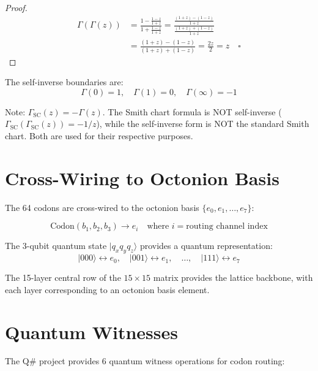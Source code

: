 \documentclass[11pt]{article}
\begin{document}
\begin{proof}
\begin{align*}
\Gamma(\Gamma(z)) &= \frac{1 - \frac{1-z}{1+z}}{1 + \frac{1-z}{1+z}} = \frac{\frac{(1+z) - (1-z)}{1+z}}{\frac{(1+z) + (1-z)}{1+z}} \\
&= \frac{(1+z) - (1-z)}{(1+z) + (1-z)} = \frac{2z}{2} = z \quad \square
\end{align*}
\end{proof}

The self-inverse boundaries are:
\begin{equation}
\Gamma(0) = 1, \quad \Gamma(1) = 0, \quad \Gamma(\infty) = -1
\end{equation}

Note: $\Gamma_{\text{SC}}(z) = -\Gamma(z)$. The Smith chart formula is NOT self-inverse ($\Gamma_{\text{SC}}(\Gamma_{\text{SC}}(z)) = -1/z$), while the self-inverse form is NOT the standard Smith chart. Both are used for their respective purposes.

\section{Cross-Wiring to Octonion Basis}

The 64 codons are cross-wired to the octonion basis $\{e_0, e_1, \ldots, e_7\}$:

\begin{equation}
\text{Codon}(b_1, b_2, b_3) \to e_i \quad \text{where } i = \text{routing channel index}
\end{equation}

The 3-qubit quantum state $|q_x q_y q_z\rangle$ provides a quantum representation:
\begin{equation}
|000\rangle \leftrightarrow e_0, \quad |001\rangle \leftrightarrow e_1, \quad \ldots, \quad |111\rangle \leftrightarrow e_7
\end{equation}

The 15-layer central row of the $15 \times 15$ matrix provides the lattice backbone, with each layer corresponding to an octonion basis element.

\section{Quantum Witnesses}

The Q\# project provides 6 quantum witness operations for codon routing:
\end{document}
